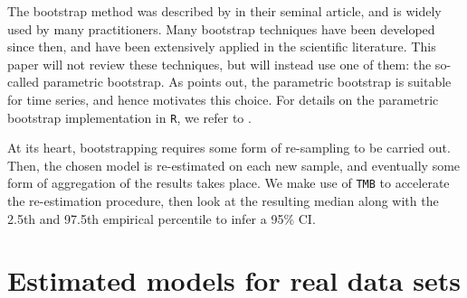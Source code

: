 \documentclass[]{interact}\usepackage[]{graphicx}\usepackage[dvipsnames]{xcolor}
\theoremstyle{plain}%
\theoremstyle{definition}
\theoremstyle{remark}
\begin{document}
The bootstrap method was described by \cite{efron} in their seminal article, and is widely used by many practitioners. Many bootstrap techniques have been developed since then, and have been extensively applied in the scientific literature. This paper will not review these techniques, but will instead use one of them: the so-called parametric bootstrap. As \cite{hardle} points out, the parametric bootstrap is suitable for time series, and hence motivates this choice. For details on the parametric bootstrap implementation in {\tt{R}}, we refer to \cite[][Ch.~3.6.2, pp.~58-60]{zucchini}. 

At its heart, bootstrapping requires some form of re-sampling to be carried out. Then, the chosen model is re-estimated on each new sample, and eventually some form of aggregation of the results takes place.
We make use of {\tt{TMB}} to accelerate the re-estimation procedure, then look at the resulting median along with the 2.5th and 97.5th empirical percentile to infer a 95\% CI.



\section{Estimated models for real data sets}
\label{sec:appendix-estmod}











\end{document}
